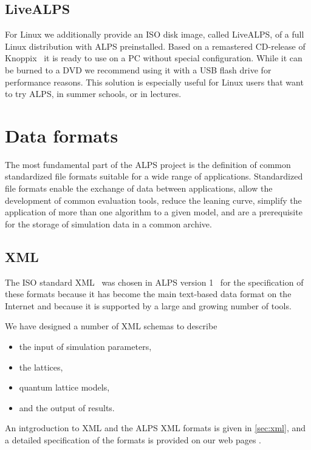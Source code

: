 \documentclass[12pt]{iopart}
\begin{document}
\subsection{LiveALPS}

For Linux we additionally provide an ISO disk image, called LiveALPS, of a full Linux distribution with ALPS preinstalled. 
Based on a remastered CD-release of Knoppix~\cite{knoppix} it is ready to use 
on a PC without special configuration. While it can be burned to a DVD we recommend using it with a USB flash drive for performance reasons.
This solution is especially useful for Linux users that want to try ALPS, in summer schools, or in lectures.

\section{Data formats}

The most fundamental part of the ALPS project is the definition of
common standardized file formats suitable for a wide range of
applications. Standardized file formats enable the exchange of data
between applications, allow the development of common evaluation
tools, reduce the leaning curve, simplify the application of more than one algorithm to a given
model, and are a prerequisite for the storage of simulation data in a
common archive.


\subsection{XML}


 The ISO
standard XML~\cite{xml} was chosen in ALPS version 1~\cite{ALPS1.2,ALPS1.3} for the specification of these formats
because it has become
the main text-based data format on the Internet and because it is
supported by a large and growing number of tools.

We have designed a number of XML  schemas \cite{xmlschema} to describe
\begin{itemize}
\item the input of simulation parameters,
\item the lattices,
\item quantum lattice models,   
\item and the output of results.
\end{itemize}

An intgroduction to XML and the ALPS XML formats is given in \ref{sec:xml}, and a  detailed specification of the formats is provided on
our web pages \cite{alps,xmlschema}.
\end{document}
